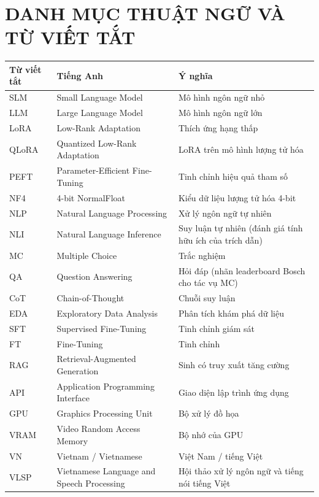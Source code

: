 \chapter*{DANH MỤC THUẬT NGỮ VÀ TỪ VIẾT TẮT}

\begingroup
\footnotesize
\begin{longtable}[c]{|l|p{6cm}|p{6.5cm}|}
\hline
\textbf{Từ viết tắt} & \textbf{Tiếng Anh} & \textbf{Ý nghĩa} \\
\hline
\endhead
SLM & Small Language Model & Mô hình ngôn ngữ nhỏ \\
\hline
LLM & Large Language Model & Mô hình ngôn ngữ lớn \\
\hline
LoRA & Low-Rank Adaptation & Thích ứng hạng thấp \\
\hline
QLoRA & Quantized Low-Rank Adaptation & LoRA trên mô hình lượng tử hóa \\
\hline
PEFT & Parameter-Efficient Fine-Tuning & Tinh chỉnh hiệu quả tham số \\
\hline
NF4 & 4-bit NormalFloat & Kiểu dữ liệu lượng tử hóa 4-bit \\
\hline
NLP & Natural Language Processing & Xử lý ngôn ngữ tự nhiên \\
\hline
NLI & Natural Language Inference & Suy luận tự nhiên (đánh giá tính hữu ích của trích dẫn) \\
\hline
MC & Multiple Choice & Trắc nghiệm \\
\hline
QA & Question Answering & Hỏi đáp (nhãn leaderboard Bosch cho tác vụ MC) \\
\hline
CoT & Chain-of-Thought & Chuỗi suy luận \\
\hline
EDA & Exploratory Data Analysis & Phân tích khám phá dữ liệu \\
\hline
SFT & Supervised Fine-Tuning & Tinh chỉnh giám sát \\
\hline
FT & Fine-Tuning & Tinh chỉnh \\
\hline
RAG & Retrieval-Augmented Generation & Sinh có truy xuất tăng cường \\
\hline
API & Application Programming Interface & Giao diện lập trình ứng dụng \\
\hline
GPU & Graphics Processing Unit & Bộ xử lý đồ họa \\
\hline
VRAM & Video Random Access Memory & Bộ nhớ của GPU \\
\hline
VN & Vietnam / Vietnamese & Việt Nam / tiếng Việt \\
\hline
VLSP & Vietnamese Language and Speech Processing & Hội thảo xử lý ngôn ngữ và tiếng nói tiếng Việt \\
\hline
\end{longtable}
\endgroup
